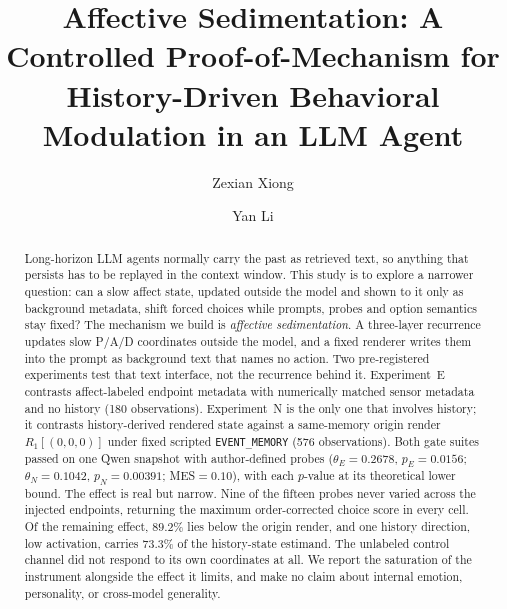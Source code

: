 \documentclass[sigconf]{acmart}
\begin{document}
\title{Affective Sedimentation: A Controlled Proof-of-Mechanism for History-Driven Behavioral Modulation in an LLM Agent}

\author{Zexian Xiong}

\author{Yan Li}

\renewcommand{\shortauthors}{Xiong and Li}

\begin{abstract}
Long-horizon LLM agents normally carry the past as retrieved text, so anything that persists has to be replayed in the context window. This study is to explore a narrower question: can a slow affect state, updated outside the model and shown to it only as background metadata, shift forced choices while prompts, probes and option semantics stay fixed? The mechanism we build is \emph{affective sedimentation}. A three-layer recurrence updates slow P/A/D coordinates outside the model, and a fixed renderer writes them into the prompt as background text that names no action. Two pre-registered experiments test that text interface, not the recurrence behind it. Experiment~E contrasts affect-labeled endpoint metadata with numerically matched sensor metadata and no history (180 observations). Experiment~N is the only one that involves history; it contrasts history-derived rendered state against a same-memory origin render $R_1[(0,0,0)]$ under fixed scripted \texttt{EVENT\_MEMORY} (576 observations). Both gate suites passed on one Qwen snapshot with author-defined probes ($\theta_E{=}0.2678$, $p_E{=}0.0156$; $\theta_N{=}0.1042$, $p_N{=}0.00391$; MES${=}0.10$), with each $p$-value at its theoretical lower bound. The effect is real but narrow. Nine of the fifteen probes never varied across the injected endpoints, returning the maximum order-corrected choice score in every cell. Of the remaining effect, $89.2\%$ lies below the origin render, and one history direction, low activation, carries $73.3\%$ of the history-state estimand. The unlabeled control channel did not respond to its own coordinates at all. We report the saturation of the instrument alongside the effect it limits, and make no claim about internal emotion, personality, or cross-model generality.
\end{abstract}
\end{document}
